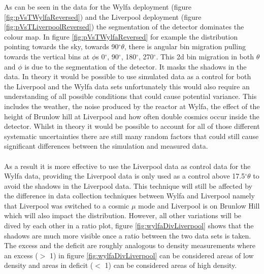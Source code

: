 As can be seen in the data for the Wylfa deployment (figure \ref{fig:pVsTWylfaReversed}) and the Liverpool deployment (figure \ref{fig:pVsTLiverpoolReversed}) the segmentation of the detector dominates the colour map. In figure \ref{fig:pVsTWylfaReversed} for example the distribution pointing towards the sky, towards 90$^\circ \theta$, there is angular bin migration pulling towards the vertical bins at $\phi$s 0$^\circ$, 90$^\circ$, 180$^\circ$, 270$^\circ$. This 2d bin migration in both $\theta$ and $\phi$ is due to the segmentation of the detector. It masks the shadows in the data. In theory it would be possible to use simulated data as a control for both the Liverpool and the Wylfa data sets unfortunately this would also require an understanding of all possible conditions that could cause potential variance. This includes the weather, the noise produced by the reactor at Wylfa, the effect of the height of Brunlow hill at Liverpool and how often double cosmics occur inside the detector. Whilst in theory it would be possible to account for all of those different systematic uncertainties there are still many random factors that could still cause significant differences between the simulation and measured data.
\\\\ As a result it is more effective to use the Liverpool data as control data for the Wylfa data, providing the Liverpool data is only used as a control above 17.5$^\circ \theta$ to avoid the shadows in the Liverpool data. This technique will still be affected by the difference in data collection techniques between Wylfa and Liverpool namely that Liverpool was switched to a cosmic $\mu$ mode and Liverpool is on Brunlow Hill which will also impact the distribution. However, all other variations will be dived by each other in a ratio plot, figure \ref{fig:wylfaDivLiverpool} shows that the shadows are much more visible once a ratio between the two data sets is taken. The excess and the deficit are roughly analogous to density measurements where an excess ($>$ 1) in figure \ref{fig:wylfaDivLiverpool} can be considered areas of low density and areas in deficit ($<$ 1) can be considered areas of high density. 
